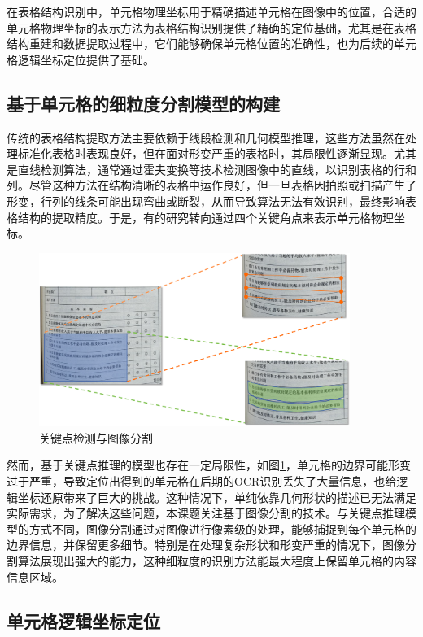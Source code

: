 \documentclass[UTF8,12pt, AutoFakeBold,fontset = founder]{ctexart}
\begin{document}
在表格结构识别中，单元格物理坐标用于精确描述单元格在图像中的位置，合适的单元格物理坐标的表示方法为表格结构识别提供了精确的定位基础，尤其是在表格结构重建和数据提取过程中，它们能够确保单元格位置的准确性，也为后续的单元格逻辑坐标定位提供了基础。

\subsection{基于单元格的细粒度分割模型的构建}

传统的表格结构提取方法主要依赖于线段检测和几何模型推理，这些方法虽然在处理标准化表格时表现良好，但在面对形变严重的表格时，其局限性逐渐显现。尤其是直线检测算法，通常通过霍夫变换等技术检测图像中的直线，以识别表格的行和列。尽管这种方法在结构清晰的表格中运作良好，但一旦表格因拍照或扫描产生了形变，行列的线条可能出现弯曲或断裂，从而导致算法无法有效识别，最终影响表格结构的提取精度。于是，有的研究转向通过四个关键角点来表示单元格物理坐标。

\begin{figure}[H]
    \centering
    \includegraphics[width=0.9\textwidth]{../images/point.png}
    \caption{关键点检测与图像分割}
    \label{fig:p}
\end{figure}

然而，基于关键点推理的模型也存在一定局限性，如图\ref{fig:p}，单元格的边界可能形变过于严重，导致定位出得到的单元格在后期的OCR识别丢失了大量信息，也给逻辑坐标还原带来了巨大的挑战。这种情况下，单纯依靠几何形状的描述已无法满足实际需求，为了解决这些问题，本课题关注基于图像分割的技术。与关键点推理模型的方式不同，图像分割通过对图像进行像素级的处理，能够捕捉到每个单元格的边界信息，并保留更多细节。特别是在处理复杂形状和形变严重的情况下，图像分割算法展现出强大的能力，这种细粒度的识别方法能最大程度上保留单元格的内容信息区域。

\subsection{单元格逻辑坐标定位}
\end{document}
